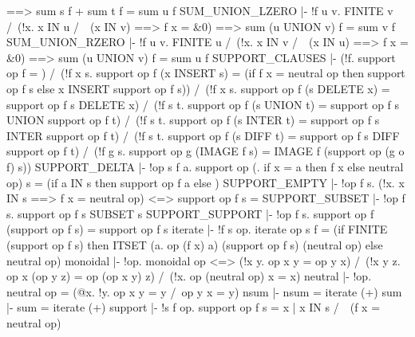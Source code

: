          ==> sum s f + sum t f = sum u f
\ENDTHEOREM
\THEOREM SUM\_UNION\_LZERO
  |- !f u v.
         FINITE v /\ (!x. x IN u /\ ~(x IN v) ==> f x = &0)
         ==> sum (u UNION v) f = sum v f
\ENDTHEOREM
\THEOREM SUM\_UNION\_RZERO
  |- !f u v.
         FINITE u /\ (!x. x IN v /\ ~(x IN u) ==> f x = &0)
         ==> sum (u UNION v) f = sum u f
\ENDTHEOREM
\THEOREM SUPPORT\_CLAUSES
  |- (!f. support op f {} = {}) /\
     (!f x s.
          support op f (x INSERT s) =
          (if f x = neutral op
           then support op f s
           else x INSERT support op f s)) /\
     (!f x s. support op f (s DELETE x) = support op f s DELETE x) /\
     (!f s t. support op f (s UNION t) = support op f s UNION support op f t) /\
     (!f s t. support op f (s INTER t) = support op f s INTER support op f t) /\
     (!f s t. support op f (s DIFF t) = support op f s DIFF support op f t) /\
     (!f g s. support op g (IMAGE f s) = IMAGE f (support op (g o f) s))
\ENDTHEOREM
\THEOREM SUPPORT\_DELTA
  |- !op s f a.
         support op (\x. if x = a then f x else neutral op) s =
         (if a IN s then support op f {a} else {})
\ENDTHEOREM
\THEOREM SUPPORT\_EMPTY
  |- !op f s. (!x. x IN s ==> f x = neutral op) <=> support op f s = {}
\ENDTHEOREM
\THEOREM SUPPORT\_SUBSET
  |- !op f s. support op f s SUBSET s
\ENDTHEOREM
\THEOREM SUPPORT\_SUPPORT
  |- !op f s. support op f (support op f s) = support op f s
\ENDTHEOREM
\THEOREM iterate
  |- !f s op.
         iterate op s f =
         (if FINITE (support op f s)
          then ITSET (\x a. op (f x) a) (support op f s) (neutral op)
          else neutral op)
\ENDTHEOREM
\THEOREM monoidal
  |- !op. monoidal op <=>
          (!x y. op x y = op y x) /\
          (!x y z. op x (op y z) = op (op x y) z) /\
          (!x. op (neutral op) x = x)
\ENDTHEOREM
\THEOREM neutral
  |- !op. neutral op = (@x. !y. op x y = y /\ op y x = y)
\ENDTHEOREM
\THEOREM nsum
  |- nsum = iterate (+)
\ENDTHEOREM
\THEOREM sum
  |- sum = iterate (+)
\ENDTHEOREM
\THEOREM support
  |- !s f op. support op f s = {x | x IN s /\ ~(f x = neutral op)}
\ENDTHEOREM

